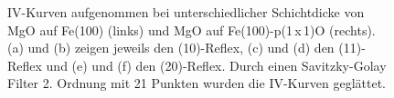\begin{figure}[H]
   \centering
   \qquad
   \qquad
   \qquad
   \qquad
   \qquad
   \caption{IV-Kurven aufgenommen bei unterschiedlicher Schichtdicke von MgO auf Fe(100) (links) und MgO auf Fe(100)-p(1\,x\,1)O (rechts).
            (a) und (b) zeigen jeweils den (10)-Reflex, (c) und (d) den (11)-Reflex und (e) und (f) den (20)-Reflex.
            Durch einen Savitzky-Golay Filter 2. Ordnung mit 21 Punkten wurden die
          IV-Kurven geglättet.}%
   \label{fig:IV2}
\end{figure}
